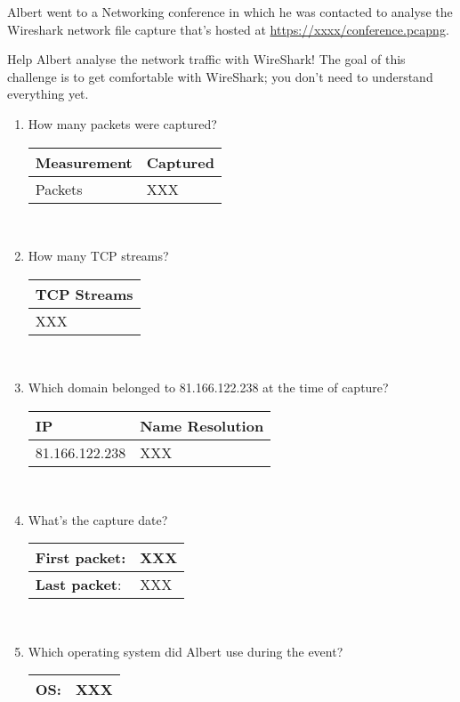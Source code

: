 \documentclass{article}
\begin{document}

\noindent
Albert went to a Networking conference in which he was contacted to analyse the Wireshark network
file capture that's hosted at \href{conference.pcapng}{https://xxxx/conference.pcapng}.

\bigskip

\noindent Help Albert analyse the network traffic with WireShark! The goal of this challenge is
  to get comfortable with WireShark; you don't need to understand everything yet.
  
\begin{enumerate}[1.]
\item How many packets were captured?   \\
  \begin{tabular}{|l|l|}\hline
    {\bf{}Measurement} &  {\bf{}Captured} \\ \hline
    Packets & XXX \\ \hline
  \end{tabular}\\
\item How many TCP streams? \\
  \begin{tabular}{|l|}\hline
    {\bf{}TCP Streams} \\ \hline
    XXX \\ \hline
  \end{tabular}\\
\item Which domain belonged to 81.166.122.238 at the time of capture?  \\
  \begin{tabular}{|l|l|}\hline
    {\bf{}IP} &  {\bf{}Name Resolution} \\ \hline
    81.166.122.238 & XXX \\ \hline
  \end{tabular}\\
  
\item What's the capture date?  \\  
  \begin{tabular}{|l|l|}\hline
    {\bf{}First packet}: & XXX \\ \hline
    {\bf{}Last packet}:  & XXX \\ \hline
  \end{tabular}\\  
\item Which operating system did Albert use during the event?  \\
  \begin{tabular}{|l|l|}\hline
    {\bf{}OS}: & XXX \\ \hline
  \end{tabular}
  
\end{enumerate}
\end{document}
